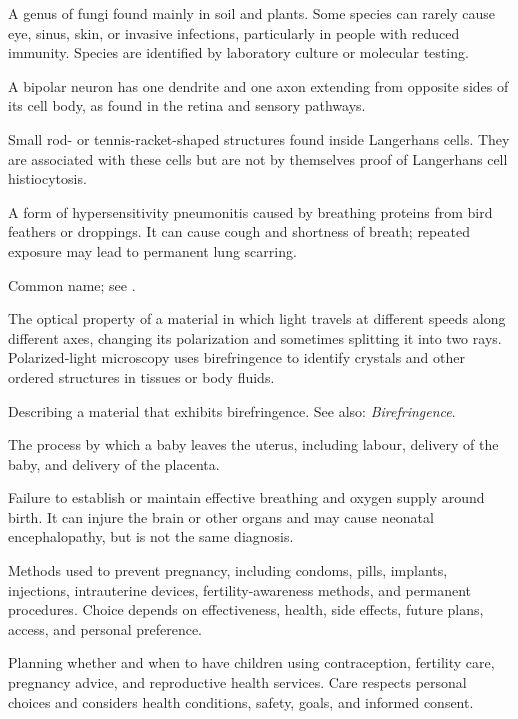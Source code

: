  A genus of fungi found mainly in soil and plants. Some
species can rarely cause eye, sinus, skin, or invasive infections, particularly
in people with reduced immunity. Species are identified by laboratory culture
or molecular testing.

 A bipolar neuron has one dendrite and one axon extending from opposite sides of its cell body, as found in the retina and sensory pathways.

 Small rod- or tennis-racket-shaped structures found inside Langerhans cells. They are associated with these cells but are not by themselves proof of Langerhans cell histiocytosis.

 A form of hypersensitivity pneumonitis caused by breathing proteins from bird feathers or droppings. It can cause cough and shortness of breath; repeated exposure may lead to permanent lung scarring.

 Common name; see .

 The optical property of a material in which light travels at different speeds along different axes, changing its polarization and sometimes splitting it into two rays. Polarized-light microscopy uses birefringence to identify crystals and other ordered structures in tissues or body fluids.

 Describing a material that exhibits birefringence. See also: \textit{Birefringence}.

 The process by which a baby leaves the uterus, including labour, delivery of the baby, and delivery of the placenta.

 Failure to establish or maintain effective breathing and oxygen supply around birth. It can injure the brain or other organs and may cause neonatal encephalopathy, but is not the same diagnosis.

 Methods used to prevent pregnancy, including condoms, pills, implants, injections, intrauterine devices, fertility-awareness methods, and permanent procedures. Choice depends on effectiveness, health, side effects, future plans, access, and personal preference.

 Planning whether and when to have children using contraception, fertility care, pregnancy advice, and reproductive health services. Care respects personal choices and considers health conditions, safety, goals, and informed consent.

